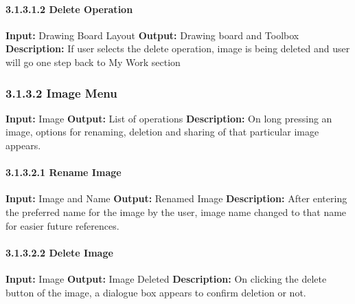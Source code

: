 \documentclass{scrreprt}
\begin{document}
\paragraph{3.1.3.1.2 Delete Operation}
\hfill \vspace{2.5mm} \break 
\textbf{Input:} Drawing Board Layout \newline
\textbf{Output:} Drawing board and Toolbox
\vspace{1mm}\newline
\textbf{Description:} \newline 
If user selects the delete operation, image is being deleted and user will go one step back to My Work section

\subsubsection{3.1.3.2 Image Menu}
\textbf{Input:} Image \newline
\textbf{Output:} List of operations
\vspace{1mm}\newline
\textbf{Description:} \newline 
On long pressing an image, options for renaming, deletion and sharing of that particular image appears.

\paragraph{3.1.3.2.1 Rename Image}
\hfill \vspace{2.5mm} \break 
\textbf{Input:} Image and Name \newline
\textbf{Output:} Renamed Image
\vspace{1mm}\newline
\textbf{Description:} \newline 
After entering the preferred name for the image by the user, image name changed to that name for easier future references.

\paragraph{3.1.3.2.2 Delete Image}
\hfill \vspace{2.5mm} \break 
\textbf{Input:} Image \newline
\textbf{Output:} Image Deleted
\vspace{1mm}\newline
\textbf{Description:} \newline 
On clicking the delete button of the image, a dialogue box appears to confirm deletion or not.
\end{document}
